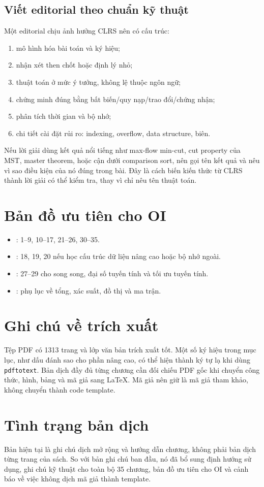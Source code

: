 \documentclass[11pt]{article}
\begin{document}
\subsection{Viết editorial theo chuẩn kỹ thuật}

Một editorial chịu ảnh hưởng CLRS nên có cấu trúc:
\begin{enumerate}
  \item mô hình hóa bài toán và ký hiệu;
  \item nhận xét then chốt hoặc định lý nhỏ;
  \item thuật toán ở mức ý tưởng, không lệ thuộc ngôn ngữ;
  \item chứng minh đúng bằng bất biến/quy nạp/trao đổi/chứng nhận;
  \item phân tích thời gian và bộ nhớ;
  \item chi tiết cài đặt rủi ro: indexing, overflow, data structure, biên.
\end{enumerate}

Nếu lời giải dùng kết quả nổi tiếng như max-flow min-cut, cut property của MST,
master theorem, hoặc cận dưới comparison sort, nên gọi tên kết quả và nêu vì
sao điều kiện của nó đúng trong bài. Đây là cách biến kiến thức từ CLRS thành
lời giải có thể kiểm tra, thay vì chỉ nêu tên thuật toán.

\section{Bản đồ ưu tiên cho OI}

\begin{itemize}
  \item {}: 1--9, 10--17, 21--26, 30--35.
  \item {}: 18, 19, 20 nếu học cấu trúc dữ liệu nâng cao hoặc bộ
        nhớ ngoài.
  \item {}: 27--29 cho song song, đại số tuyến tính và
        tối ưu tuyến tính.
  \item {}: phụ lục về tổng, xác suất, đồ thị và ma trận.
\end{itemize}

\section{Ghi chú về trích xuất}

Tệp PDF có 1313 trang và lớp văn bản trích xuất tốt. Một số ký hiệu trong mục
lục, như dấu đánh sao cho phần nâng cao, có thể hiện thành ký tự lạ khi dùng
\texttt{pdftotext}. Bản dịch đầy đủ từng chương cần đối chiếu PDF gốc khi
chuyển công thức, hình, bảng và mã giả sang LaTeX. Mã giả nên giữ là mã giả
tham khảo, không chuyển thành code template.

\section{Tình trạng bản dịch}

Bản hiện tại là ghi chú dịch mở rộng và hướng dẫn chương, không phải bản dịch
từng trang của sách. So với bản ghi chú ban đầu, nó đã bổ sung định hướng sử
dụng, ghi chú kỹ thuật cho toàn bộ 35 chương, bản đồ ưu tiên cho OI và cảnh
báo về việc không dịch mã giả thành template.
\end{document}
